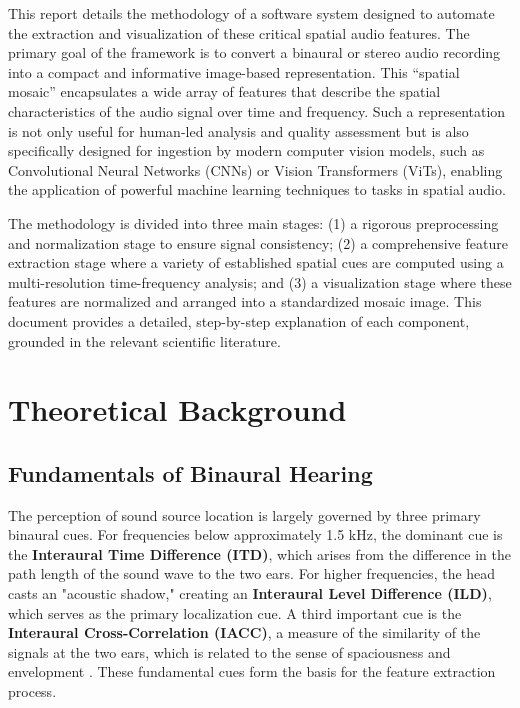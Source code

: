 \documentclass[12pt, a4paper]{article}
\begin{document}
This report details the methodology of a software system designed to automate the extraction and visualization of these critical spatial audio features. The primary goal of the framework is to convert a binaural or stereo audio recording into a compact and informative image-based representation. This ``spatial mosaic'' encapsulates a wide array of features that describe the spatial characteristics of the audio signal over time and frequency. Such a representation is not only useful for human-led analysis and quality assessment but is also specifically designed for ingestion by modern computer vision models, such as Convolutional Neural Networks (CNNs) or Vision Transformers (ViTs), enabling the application of powerful machine learning techniques to tasks in spatial audio.

The methodology is divided into three main stages: (1) a rigorous preprocessing and normalization stage to ensure signal consistency; (2) a comprehensive feature extraction stage where a variety of established spatial cues are computed using a multi-resolution time-frequency analysis; and (3) a visualization stage where these features are normalized and arranged into a standardized mosaic image. This document provides a detailed, step-by-step explanation of each component, grounded in the relevant scientific literature.

\section{Theoretical Background}

\subsection{Fundamentals of Binaural Hearing}
The perception of sound source location is largely governed by three primary binaural cues. For frequencies below approximately 1.5 kHz, the dominant cue is the \textbf{Interaural Time Difference (ITD)}, which arises from the difference in the path length of the sound wave to the two ears. For higher frequencies, the head casts an "acoustic shadow," creating an \textbf{Interaural Level Difference (ILD)}, which serves as the primary localization cue. A third important cue is the \textbf{Interaural Cross-Correlation (IACC)}, a measure of the similarity of the signals at the two ears, which is related to the sense of spaciousness and envelopment \cite{blauert1997spatial, breebaart2001binaural}. These fundamental cues form the basis for the feature extraction process.
\end{document}
